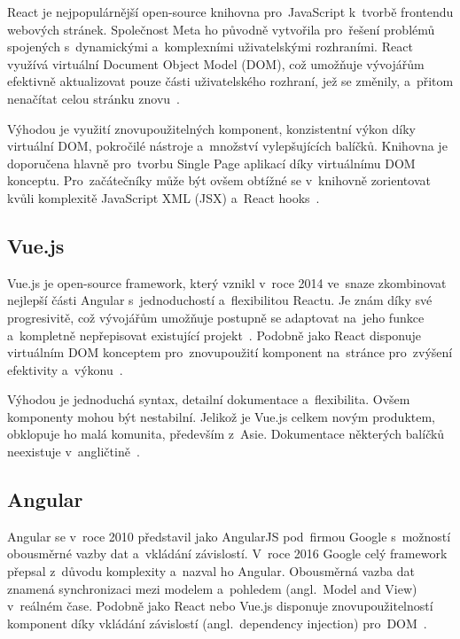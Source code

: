 \documentclass[twoside]{ctuthesis}
\begin{document}
React je nejpopulárnější open-source knihovna pro~JavaScript k~tvorbě frontendu webových stránek. Společnost Meta ho původně vytvořila pro~řešení problémů spojených s~dynamickými a~komplexními uživatelskými rozhraními. React využívá virtuální Document Object Model (DOM), což umožňuje vývojářům efektivně aktualizovat pouze části uživatelského rozhraní, jež se změnily, a~přitom nenačítat celou stránku znovu~\cite{roadmap, react}.

Výhodou je využití znovupoužitelných komponent, konzistentní výkon díky virtuální DOM, pokročilé nástroje a~množství vylepšujících balíčků. Knihovna je doporučena hlavně pro~tvorbu Single Page aplikací díky virtuálnímu DOM konceptu. Pro~začátečníky může být ovšem obtížné se v~knihovně zorientovat kvůli komplexitě JavaScript XML (JSX) a~React hooks~\cite{simform}.

\subsection{Vue.js}

Vue.js je open-source framework, který vznikl v~roce 2014 ve~snaze zkombinovat nejlepší části Angular s~jednoduchostí a~flexibilitou Reactu. Je znám díky své progresivitě, což vývojářům umožňuje postupně se adaptovat na~jeho funkce a~kompletně nepřepisovat existující projekt~\cite{roadmap, vue}. Podobně jako React disponuje virtuálním DOM konceptem pro~znovupoužití komponent na~stránce pro~zvýšení efektivity a~výkonu~\cite{wad}.

Výhodou je jednoduchá syntax, detailní dokumentace a~flexibilita. Ovšem komponenty mohou být nestabilní. Jelikož je Vue.js celkem novým produktem, obklopuje ho malá komunita, především z~Asie. Dokumentace některých balíčků neexistuje v~angličtině~\cite{simform, wad}.
%

\subsection{Angular}

Angular se v~roce 2010 představil jako AngularJS pod~firmou Google s~možností obousměrné vazby dat a~vkládání závislostí. V~roce 2016 Google celý framework přepsal z~důvodu komplexity a~nazval ho Angular. Obousměrná vazba dat znamená synchronizaci mezi modelem a~pohledem (angl.~Model and View) v~reálném čase. Podobně jako React nebo Vue.js disponuje znovupoužitelností komponent díky vkládání závislostí (angl.~dependency injection) pro~DOM~\cite{roadmap, wad}.
\end{document}
